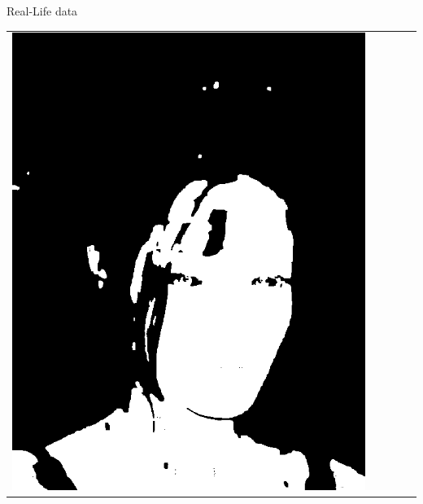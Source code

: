 \documentclass{beamer}
\begin{document}
\begin{frame}[c]{Real-Life data}
\begin{table}[h!]
\begin{tabular}{ | m{1.8cm} | m{1.8cm} | m{1.8cm}| m{1.8cm} | m{1.8cm} |}
\begin{minipage}{1.8cm}
				\includegraphics[width=\linewidth]{realLife/test0_mask_EGGER_.png}
				\vspace{1pt}
			\end{minipage}
			& 
			\begin{minipage}{1.8cm}
				\centering
				\vspace{1pt}

\end{minipage}
\end{tabular}
\end{table}
\end{frame}
\end{document}
